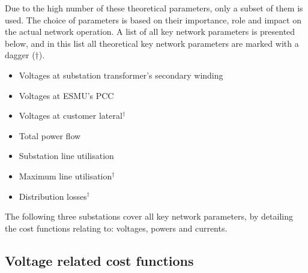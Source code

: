 Due to the high number of these theoretical parameters, only a subset of them is used.
The choice of parameters is based on their importance, role and impact on the actual network operation.
A list of all key network parameters is presented below, and in this list all theoretical key network parameters are marked with a dagger ($\dagger$).

\begin{itemize}
	\item Voltages at substation transformer's secondary winding
	\item Voltages at ESMU's PCC
	\item Voltages at customer lateral$^{\dagger}$
	\item Total power flow
	\item Substation line utilisation
	\item Maximum line utilisation$^{\dagger}$
	\item Distribution losses$^{\dagger}$
\end{itemize}


The following three substations cover all key network parameters, by detailing the cost functions relating to: voltages, powers and currents.

\subsection{Voltage related cost functions}
\label{ch1:subsec:voltages-related-cost-functions}


